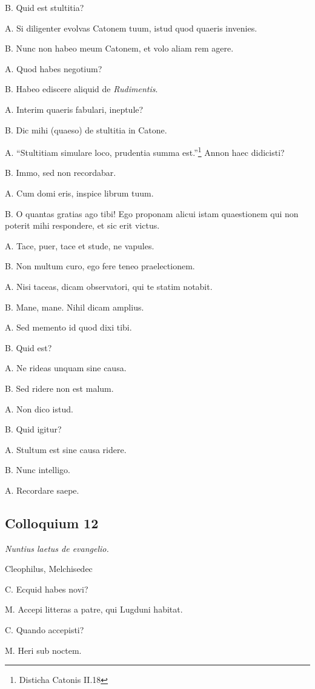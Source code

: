 \documentclass{article}
\begin{document}
B. Quid est stultitia?

A. Si diligenter evolvas Catonem tuum, istud quod quaeris invenies. 

B. Nunc non habeo meum Catonem, et volo aliam rem agere. 

A. Quod habes negotium?

B. Habeo ediscere aliquid de \emph{Rudimentis}. 

A. Interim quaeris fabulari, ineptule?

B. Dic mihi (quaeso) de stultitia in Catone. 

A. ``Stultitiam simulare loco, prudentia summa est.''\footnote{Disticha Catonis II.18} Annon haec didicisti?

B. Immo, sed non recordabar. 

A. Cum domi eris, inspice librum tuum. 

B. O quantas gratias ago tibi! Ego proponam alicui istam quaestionem qui non poterit mihi respondere, et sic erit victus. 

A. Tace, puer, tace et stude, ne vapules. 

B. Non multum curo, ego fere teneo praelectionem. 

A. Nisi taceas, dicam observatori, qui te statim notabit. 

B. Mane, mane. Nihil dicam amplius. 

A. Sed memento id quod dixi tibi. 

B. Quid est?

A. Ne rideas unquam sine causa. 

B. Sed ridere non est malum. 

A. Non dico istud. 

B. Quid igitur?

A. Stultum est sine causa ridere. 

B. Nunc intelligo. 

A. Recordare saepe.

\subsection{Colloquium 12}
\emph{Nuntius laetus de evangelio.}

Cleophilus, Melchisedec

C. Ecquid habes novi?

M. Accepi litteras a patre, qui Lugduni habitat. 

C. Quando accepisti?

M. Heri sub noctem. 
\end{document}
